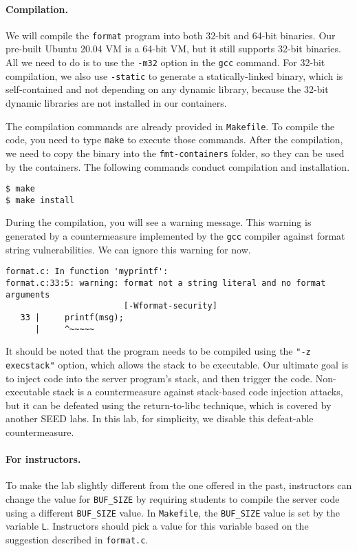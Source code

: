 \paragraph{Compilation.} 
We will compile the \texttt{format} program into both 32-bit and 64-bit
binaries. Our pre-built Ubuntu 20.04 VM is a 64-bit VM, but it
still supports 32-bit binaries. All we need to do is to
use the \texttt{-m32} option in the \texttt{gcc} command.
For 32-bit compilation, we also use \texttt{-static} to generate
a statically-linked binary, which is self-contained and not depending
on any dynamic library, because the 32-bit dynamic libraries
are not installed in our containers.

The compilation commands are already provided in \texttt{Makefile}. To compile
the code, you need to type \texttt{make} to execute those commands.
After the compilation, we need to copy the binary into
the \texttt{fmt-containers} folder, so they can be used by the
containers. The following commands conduct compilation and
installation.

\begin{lstlisting}
$ make
$ make install
\end{lstlisting}


During the compilation, you will see a
warning message. This warning is generated by a countermeasure implemented by
the \texttt{gcc} compiler against format string vulnerabilities. We can
ignore this warning for now. 

\begin{lstlisting}
format.c: In function 'myprintf':
format.c:33:5: warning: format not a string literal and no format arguments
                        [-Wformat-security]
   33 |     printf(msg);
      |     ^~~~~~
\end{lstlisting}

It should be noted that the program needs to be compiled using 
the \texttt{"-z execstack"} option, which allows the stack to be 
executable. Our ultimate goal is to inject code into the 
server program's stack, and then trigger the code. 
Non-executable stack is a countermeasure against stack-based 
code injection attacks, but 
it can be defeated using the return-to-libc technique, which 
is covered by another SEED labs. In this lab, for simplicity,
we disable this defeat-able countermeasure. 


\paragraph{For instructors.} 
To make the lab slightly different from the one offered in the past,
instructors can change the value for \texttt{BUF\_SIZE} by requiring
students to compile the server code using a different \texttt{BUF\_SIZE} value.
In \texttt{Makefile}, the \texttt{BUF\_SIZE} value is set by
the variable \texttt{L}. Instructors should pick a value for 
this variable based on the suggestion described in \texttt{format.c}.


